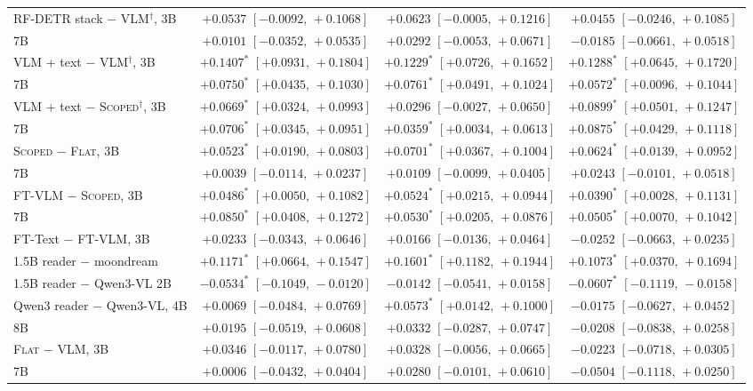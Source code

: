 \documentclass[10pt]{article}
\begin{document}
\begin{table}[h]
\begin{tabular}{@{}lccc@{}}
RF-DETR stack $-$ VLM$^{\dagger}$, 3B & $+0.0537$ $[-0.0092,\,+0.1068]$ & $+0.0623$ $[-0.0005,\,+0.1216]$ & $+0.0455$ $[-0.0246,\,+0.1085]$ \\
7B & $+0.0101$ $[-0.0352,\,+0.0535]$ & $+0.0292$ $[-0.0053,\,+0.0671]$ & $-0.0185$ $[-0.0661,\,+0.0518]$ \\
VLM + text $-$ VLM$^{\dagger}$, 3B & $+0.1407^{*}$ $[+0.0931,\,+0.1804]$ & $+0.1229^{*}$ $[+0.0726,\,+0.1652]$ & $+0.1288^{*}$ $[+0.0645,\,+0.1720]$ \\
7B & $+0.0750^{*}$ $[+0.0435,\,+0.1030]$ & $+0.0761^{*}$ $[+0.0491,\,+0.1024]$ & $+0.0572^{*}$ $[+0.0096,\,+0.1044]$ \\
VLM + text $-$ \textsc{Scoped}$^{\dagger}$, 3B & $+0.0669^{*}$ $[+0.0324,\,+0.0993]$ & $+0.0296$ $[-0.0027,\,+0.0650]$ & $+0.0899^{*}$ $[+0.0501,\,+0.1247]$ \\
7B & $+0.0706^{*}$ $[+0.0345,\,+0.0951]$ & $+0.0359^{*}$ $[+0.0034,\,+0.0613]$ & $+0.0875^{*}$ $[+0.0429,\,+0.1118]$ \\
\textsc{Scoped} $-$ \textsc{Flat}, 3B & $+0.0523^{*}$ $[+0.0190,\,+0.0803]$ & $+0.0701^{*}$ $[+0.0367,\,+0.1004]$ & $+0.0624^{*}$ $[+0.0139,\,+0.0952]$ \\
7B & $+0.0039$ $[-0.0114,\,+0.0237]$ & $+0.0109$ $[-0.0099,\,+0.0405]$ & $+0.0243$ $[-0.0101,\,+0.0518]$ \\
FT-VLM $-$ \textsc{Scoped}, 3B & $+0.0486^{*}$ $[+0.0050,\,+0.1082]$ & $+0.0524^{*}$ $[+0.0215,\,+0.0944]$ & $+0.0390^{*}$ $[+0.0028,\,+0.1131]$ \\
7B & $+0.0850^{*}$ $[+0.0408,\,+0.1272]$ & $+0.0530^{*}$ $[+0.0205,\,+0.0876]$ & $+0.0505^{*}$ $[+0.0070,\,+0.1042]$ \\
FT-Text $-$ FT-VLM, 3B & $+0.0233$ $[-0.0343,\,+0.0646]$ & $+0.0166$ $[-0.0136,\,+0.0464]$ & $-0.0252$ $[-0.0663,\,+0.0235]$ \\
1.5B reader $-$ moondream & $+0.1171^{*}$ $[+0.0664,\,+0.1547]$ & $+0.1601^{*}$ $[+0.1182,\,+0.1944]$ & $+0.1073^{*}$ $[+0.0370,\,+0.1694]$ \\
1.5B reader $-$ Qwen3-VL 2B & $-0.0534^{*}$ $[-0.1049,\,-0.0120]$ & $-0.0142$ $[-0.0541,\,+0.0158]$ & $-0.0607^{*}$ $[-0.1119,\,-0.0158]$ \\
Qwen3 reader $-$ Qwen3-VL, 4B & $+0.0069$ $[-0.0484,\,+0.0769]$ & $+0.0573^{*}$ $[+0.0142,\,+0.1000]$ & $-0.0175$ $[-0.0627,\,+0.0452]$ \\
8B & $+0.0195$ $[-0.0519,\,+0.0608]$ & $+0.0332$ $[-0.0287,\,+0.0747]$ & $-0.0208$ $[-0.0838,\,+0.0258]$ \\
\midrule \textsc{Flat} $-$ VLM, 3B & $+0.0346$ $[-0.0117,\,+0.0780]$ & $+0.0328$ $[-0.0056,\,+0.0665]$ & $-0.0223$ $[-0.0718,\,+0.0305]$ \\
7B & $+0.0006$ $[-0.0432,\,+0.0404]$ & $+0.0280$ $[-0.0101,\,+0.0610]$ & $-0.0504$ $[-0.1118,\,+0.0250]$ \\
\bottomrule
\end{tabular}
\end{table}
\end{document}
